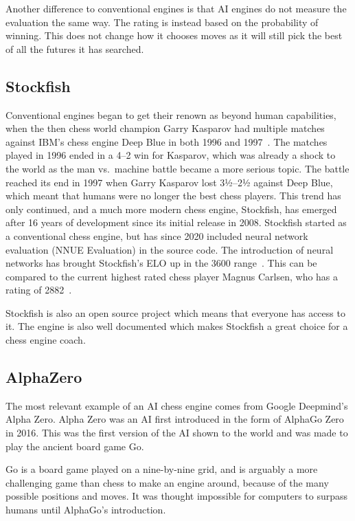 Another difference to conventional engines is that AI engines do not measure the evaluation the same way.
The rating is instead based on the probability of winning.
This does not change how it chooses moves as it will still pick the best of all the futures it has searched.

\subsection{Stockfish}\label{subsec:stockfish}

Conventional engines began to get their renown as beyond human capabilities, when the then chess world champion
Garry Kasparov had multiple matches against IBM's chess engine Deep Blue in both 1996 and
1997~\cite{Garry-Kasparov-vs-Deep-Blue}.
The matches played in 1996 ended in a 4--2 win for Kasparov, which was already a shock to the world as the man vs.\
machine battle became a more serious topic.
The battle reached its end in 1997 when Garry Kasparov lost 3½--2½ against Deep Blue, which meant that humans
were no longer the best chess players.
This trend has only continued, and a much more modern chess engine, Stockfish, has emerged after 16 years of development
since its initial release in 2008.
Stockfish started as a conventional chess engine, but has since 2020 included neural network
evaluation (NNUE Evaluation) in the source code.
The introduction of neural networks has brought Stockfish's ELO up in the 3600 range~\cite{stockfish-nnue-evaluation}.
This can be compared to the current highest rated chess player Magnus Carlsen, who has a
rating of 2882~\cite{highest-ELO-chess-player}.

Stockfish is also an open source project which means that everyone has access to it.
The engine is also well documented which makes Stockfish a great choice for a chess engine coach.

\subsection{AlphaZero}\label{subsec:alphazero}

The most relevant example of an AI chess engine comes from Google Deepmind's Alpha Zero.
Alpha Zero was an AI first introduced in the form of AlphaGo Zero in 2016.
This was the first version of the AI shown to the world and was made to play the ancient board game Go.

Go is a board game played on a nine-by-nine grid, and is arguably a more challenging game than chess to make an engine
around, because of the many possible positions and moves.
It was thought impossible for computers to surpass humans until AlphaGo's introduction.


